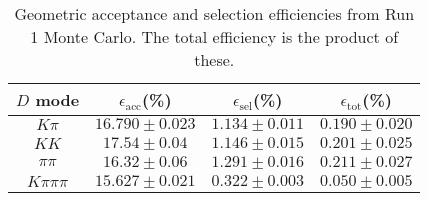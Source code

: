 \begin{table}[H]
    \centering
    \begin{tabular}{cccc}
        \toprule
        $D$ mode & $\epsilon_\mathrm{acc}$(\%) &  $\epsilon_\mathrm{sel}$(\%) &  $\epsilon_\mathrm{tot}$(\%) \\
        \midrule
        $K\pi$ & $16.790 \pm 0.023$ & $1.134 \pm 0.011$ & $0.190 \pm 0.020$ \\
        $KK$ & $17.54 \pm 0.04$ & $1.146 \pm 0.015$ & $0.201 \pm 0.025$ \\
        $\pi\pi$ & $16.32 \pm 0.06$ & $1.291 \pm 0.016$ & $0.211 \pm 0.027$ \\
        $K\pi\pi\pi$ & $15.627 \pm 0.021$ & $0.322 \pm 0.003$ & $0.050 \pm 0.005$ \\
        \bottomrule
    \end{tabular}
    \caption{Geometric acceptance and selection efficiencies from  Run 1 Monte Carlo. The total efficiency is the  product of these.}
\label{tab:selection_efficiency_run1}
\end{table}
